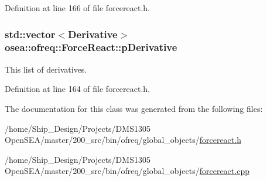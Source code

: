 Definition at line 166 of file forcereact.\-h.

\hypertarget{classosea_1_1ofreq_1_1_force_react_a28d2bfdc97809181be4d21713cc52181}{
\subsubsection[{p\-Derivative}]{\setlength{\rightskip}{0pt plus 5cm}std\-::vector$<${\bf Derivative}$>$ osea\-::ofreq\-::\-Force\-React\-::p\-Derivative\hspace{0.3cm}{\ttfamily [protected]}}}\label{classosea_1_1ofreq_1_1_force_react_a28d2bfdc97809181be4d21713cc52181}
This list of derivatives. 

Definition at line 164 of file forcereact.\-h.



The documentation for this class was generated from the following files\-:\begin{DoxyCompactItemize}
\item 
/home/\-Ship\-\_\-\-Design/\-Projects/\-D\-M\-S1305 Open\-S\-E\-A/master/200\-\_\-src/bin/ofreq/global\-\_\-objects/\hyperlink{forcereact_8h}{forcereact.\-h}\item 
/home/\-Ship\-\_\-\-Design/\-Projects/\-D\-M\-S1305 Open\-S\-E\-A/master/200\-\_\-src/bin/ofreq/global\-\_\-objects/\hyperlink{forcereact_8cpp}{forcereact.\-cpp}\end{DoxyCompactItemize}
